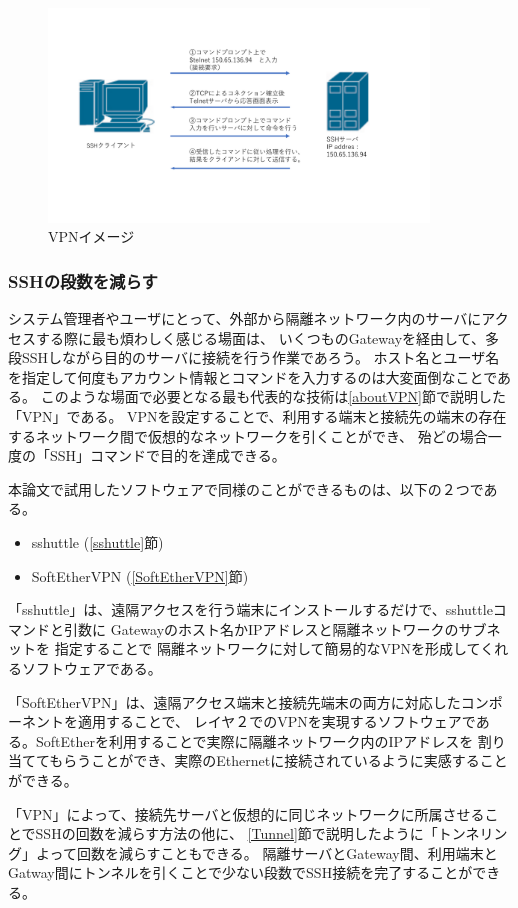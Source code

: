 \documentclass[11pt,a4j,titlepage]{jreport}
\begin{document}
\begin{figure}[h]
    \centering
    \includegraphics*[width=0.9\textwidth,page=20]{graphs/network_archtecture.pdf}
    \caption{VPNイメージ}
    \label{VPN_image}
\end{figure}

\subsubsection*{SSHの段数を減らす}

システム管理者やユーザにとって、外部から隔離ネットワーク内のサーバにアクセスする際に最も煩わしく感じる場面は、
いくつものGatewayを経由して、多段SSHしながら目的のサーバに接続を行う作業であろう。
ホスト名とユーザ名を指定して何度もアカウント情報とコマンドを入力するのは大変面倒なことである。
このような場面で必要となる最も代表的な技術は\ref{aboutVPN}節で説明した「VPN」である。
VPNを設定することで、利用する端末と接続先の端末の存在するネットワーク間で仮想的なネットワークを引くことができ、
殆どの場合一度の「SSH」コマンドで目的を達成できる。
\par 本論文で試用したソフトウェアで同様のことができるものは、以下の２つである。
\begin{itemize}
    \item sshuttle (\ref{sshuttle}節)
    \item SoftEtherVPN (\ref{SoftEtherVPN}節)
\end{itemize}\par
「sshuttle」は、遠隔アクセスを行う端末にインストールするだけで、sshuttleコマンドと引数に
Gatewayのホスト名かIPアドレスと隔離ネットワークのサブネットを
指定することで
隔離ネットワークに対して簡易的なVPNを形成してくれるソフトウェアである。

「SoftEtherVPN」は、遠隔アクセス端末と接続先端末の両方に対応したコンポーネントを適用することで、
レイヤ２でのVPNを実現するソフトウェアである。SoftEtherを利用することで実際に隔離ネットワーク内のIPアドレスを
割り当ててもらうことができ、実際のEthernetに接続されているように実感することができる。
\par 
「VPN」によって、接続先サーバと仮想的に同じネットワークに所属させることでSSHの回数を減らす方法の他に、
\ref{Tunnel}節で説明したように「トンネリング」よって回数を減らすこともできる。
隔離サーバとGateway間、利用端末とGatway間にトンネルを引くことで少ない段数でSSH接続を完了することができる。
\end{document}
